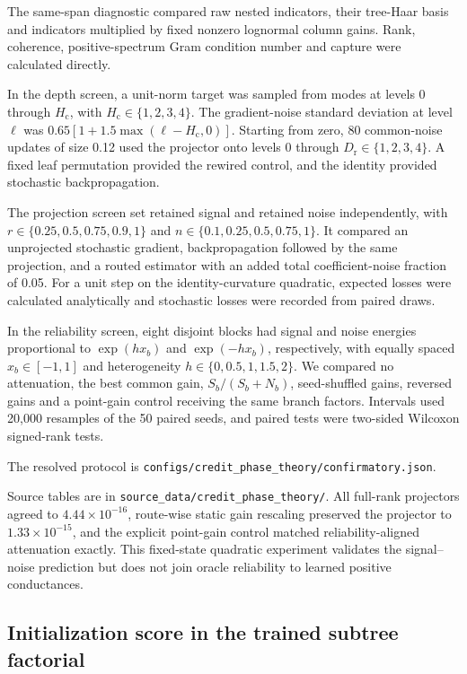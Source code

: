 The same-span diagnostic compared raw nested indicators, their tree-Haar basis
and indicators multiplied by fixed nonzero lognormal column gains. Rank,
coherence, positive-spectrum Gram condition number and capture were calculated
directly.

In the depth screen, a unit-norm target was sampled from modes at levels
$0$ through $H_{\mathrm c}$, with $H_{\mathrm c}\in\{1,2,3,4\}$. The
gradient-noise standard deviation at level $\ell$ was
$0.65[1+1.5\max(\ell-H_{\mathrm c},0)]$. Starting from zero, 80
common-noise updates of size 0.12 used the projector onto levels $0$ through
$D_{\mathrm r}\in\{1,2,3,4\}$. A fixed leaf permutation provided the rewired
control, and the identity provided stochastic backpropagation.

The projection screen set retained signal and retained noise
independently, with $r\in\{0.25,0.5,0.75,0.9,1\}$
and $n\in\{0.1,0.25,0.5,0.75,1\}$. It compared an unprojected stochastic
gradient, backpropagation followed by the same projection, and a routed
estimator with an added total coefficient-noise fraction of 0.05. For a unit
step on the identity-curvature quadratic, expected losses were calculated
analytically and stochastic losses were recorded from paired draws.

In the reliability screen, eight disjoint blocks had signal and noise energies
proportional to $\exp(hx_b)$ and $\exp(-hx_b)$, respectively, with equally
spaced $x_b\in[-1,1]$ and heterogeneity
$h\in\{0,0.5,1,1.5,2\}$. We compared no attenuation, the best common gain,
$S_b/(S_b+N_b)$, seed-shuffled gains, reversed gains and a point-gain control receiving
the same branch factors. Intervals used 20,000 resamples of the 50 paired
seeds, and paired tests were two-sided Wilcoxon signed-rank tests.

The resolved protocol is
\texttt{configs/\allowbreak credit\_phase\_theory/\allowbreak confirmatory.json}.
\par\noindent Source tables are in
\texttt{source\_data/\allowbreak credit\_phase\_theory/}.
All full-rank projectors agreed to $4.44\times10^{-16}$, route-wise
static gain rescaling preserved the projector to $1.33\times10^{-15}$, and the
explicit point-gain control matched reliability-aligned attenuation exactly. This
fixed-state quadratic experiment validates the signal--noise prediction but does not join
oracle reliability to learned positive conductances.

\subsection{Initialization score in the trained subtree factorial}

